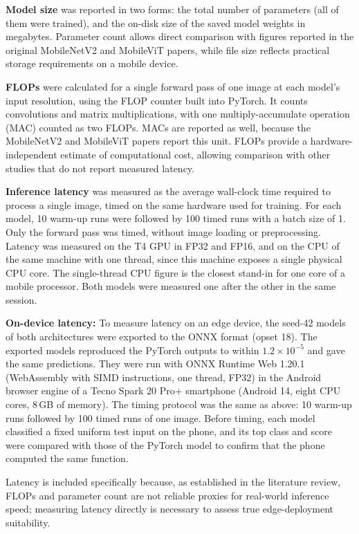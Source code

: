\documentclass[conference]{IEEEtran}
\begin{document}
\textbf{Model size} was reported in two forms: the total number of parameters (all of them were trained), and the on-disk size of the saved model weights in megabytes. Parameter count allows direct comparison with figures reported in the original MobileNetV2 and MobileViT papers, while file size reflects practical storage requirements on a mobile device.

\textbf{FLOPs} were calculated for a single forward pass of one image at each model's input resolution, using the FLOP counter built into PyTorch. It counts convolutions and matrix multiplications, with one multiply-accumulate operation (MAC) counted as two FLOPs. MACs are reported as well, because the MobileNetV2 and MobileViT papers report this unit. FLOPs provide a hardware-independent estimate of computational cost, allowing comparison with other studies that do not report measured latency.

\textbf{Inference latency} was measured as the average wall-clock time required to process a single image, timed on the same hardware used for training. For each model, 10 warm-up runs were followed by 100 timed runs with a batch size of 1. Only the forward pass was timed, without image loading or preprocessing. Latency was measured on the T4 GPU in FP32 and FP16, and on the CPU of the same machine with one thread, since this machine exposes a single physical CPU core. The single-thread CPU figure is the closest stand-in for one core of a mobile processor. Both models were measured one after the other in the same session.

\textbf{On-device latency:} To measure latency on an edge device, the seed-42 models of both architectures were exported to the ONNX format (opset 18). The exported models reproduced the PyTorch outputs to within $1.2\times10^{-5}$ and gave the same predictions. They were run with ONNX Runtime Web 1.20.1~\cite{onnxruntime} (WebAssembly with SIMD instructions, one thread, FP32) in the Android browser engine of a Tecno Spark 20 Pro+ smartphone (Android 14, eight CPU cores, 8\,GB of memory). The timing protocol was the same as above: 10 warm-up runs followed by 100 timed runs of one image. Before timing, each model classified a fixed uniform test input on the phone, and its top class and score were compared with those of the PyTorch model to confirm that the phone computed the same function.

Latency is included specifically because, as established in the literature review, FLOPs and parameter count are not reliable proxies for real-world inference speed; measuring latency directly is necessary to assess true edge-deployment suitability.
\end{document}
